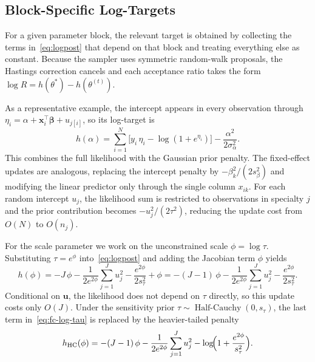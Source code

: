 \documentclass[10pt]{article}
\newcommand{\bx}{\bm{x}}
\newcommand{\bbeta}{\bm{\beta}}
\newcommand{\bu}{\bm{u}}
\DeclareMathOperator{\HalfCauchy}{Half\text{-}Cauchy}
\begin{document}
\subsection{Block-Specific Log-Targets}

For a given parameter block, the relevant target is obtained by collecting the
terms in~\eqref{eq:logpost} that depend on that block and treating everything
else as constant. Because the sampler uses symmetric random-walk proposals, the
Hastings correction cancels and each acceptance ratio takes the form
$\log R = h(\theta^*) - h(\theta^{(t)})$.

As a representative example, the intercept appears in every observation
through $\eta_i = \alpha + \bx_i^\top\bbeta + u_{j[i]}$, so its log-target is
\begin{equation}\label{eq:fc-alpha}
  h(\alpha) = \sum_{i=1}^{N}
    \bigl[y_i\,\eta_i - \log(1+e^{\eta_i})\bigr]
  - \frac{\alpha^2}{2\sigma_\alpha^2}.
\end{equation}
This combines the full likelihood with the Gaussian prior penalty. The
fixed-effect updates are analogous, replacing the intercept penalty by
$-\beta_k^2/(2s_\beta^2)$ and modifying the linear predictor only through the
single column $x_{ik}$. For each random intercept $u_j$, the likelihood sum is
restricted to observations in specialty $j$ and the prior contribution becomes
$-u_j^2/(2\tau^2)$, reducing the update cost from $O(N)$ to $O(n_j)$.

For the scale parameter we work on the unconstrained scale $\phi = \log\tau$.
Substituting $\tau = e^\phi$ into~\eqref{eq:logpost} and adding the Jacobian
term $\phi$ yields
\begin{equation}
  h(\phi)
  = -J\,\phi
    - \frac{1}{2e^{2\phi}}\sum_{j=1}^{J}u_j^2
    - \frac{e^{2\phi}}{2s_\tau^2}
    + \phi
  = -(J-1)\,\phi
     - \frac{1}{2e^{2\phi}}\sum_{j=1}^{J}u_j^2
     - \frac{e^{2\phi}}{2s_\tau^2}.
  \label{eq:fc-log-tau}
\end{equation}
Conditional on $\bu$, the likelihood does not depend on $\tau$ directly, so
this update costs only $O(J)$. Under the sensitivity prior
$\tau \sim \HalfCauchy(0, s_\tau)$, the last term in~\eqref{eq:fc-log-tau} is
replaced by the heavier-tailed penalty
\begin{equation}\label{eq:fc-log-tau-hc}
  h_{\text{HC}}(\phi)
  = -(J-1)\,\phi
    - \frac{1}{2e^{2\phi}}\sum_{j=1}^{J}u_j^2
    - \log\!\Bigl(1 + \frac{e^{2\phi}}{s_\tau^2}\Bigr).
\end{equation}
\end{document}
